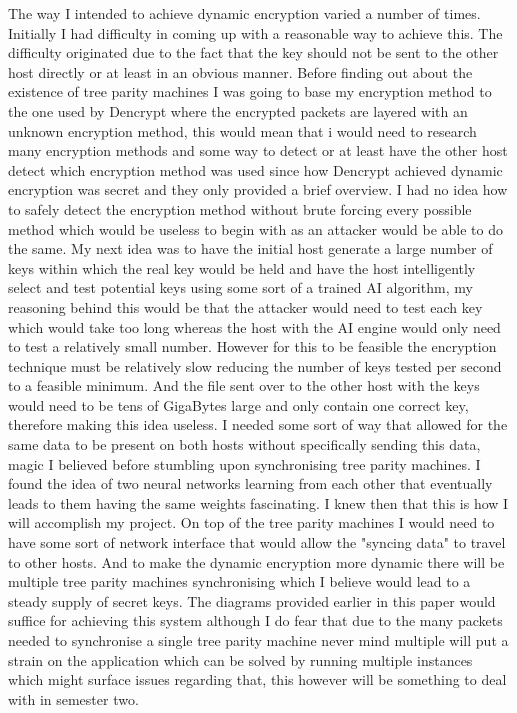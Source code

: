 The way I intended to achieve dynamic encryption varied a number of times. Initially I had difficulty in coming up with a reasonable way to achieve this. The difficulty originated due to the fact that the key should not be sent to the other host directly or at least in an obvious manner. Before finding out about the existence of tree parity machines I was going to base my encryption method to the one used by Dencrypt where the encrypted packets are layered with an unknown encryption method, this would mean that i would need to research many encryption methods and some way to detect or at least have the other host detect which encryption method was used since how Dencrypt achieved dynamic encryption was secret and they only provided a brief overview. I had no idea how to safely detect the encryption method without brute forcing every possible method which would be useless to begin with as an attacker would be able to do the same. My next idea was to have the initial host generate a large number of keys within which the real key would be held and have the host intelligently select and test potential keys using some sort of a trained AI algorithm, my reasoning behind this would be that the attacker would need to test each key which would take too long whereas the host with the AI engine would only need to test a relatively small number. However for this to be feasible the encryption technique must be relatively slow reducing the number of keys tested per second to a feasible minimum. And the file sent over to the other host with the keys would need to be tens of GigaBytes large and only contain one correct key, therefore making this idea useless. I needed some sort of way that allowed for the same data to be present on both hosts without specifically sending this data, magic I believed before stumbling upon synchronising tree parity machines. I found the idea of two neural networks learning from each other that eventually leads to them having the same weights fascinating. I knew then that this is how I will accomplish my project. On top of the tree parity machines I would need to have some sort of network interface that would allow the "syncing data" to travel to other hosts. And to make the dynamic encryption more dynamic there will be multiple tree parity machines synchronising which I believe would lead to a steady supply of secret keys. The diagrams provided earlier in this paper would suffice for achieving this system although I do fear that due to the many packets needed to synchronise a single tree parity machine never mind multiple will put a strain on the application which can be solved by running multiple instances which might surface issues regarding that, this however will be something to deal with in semester two.


